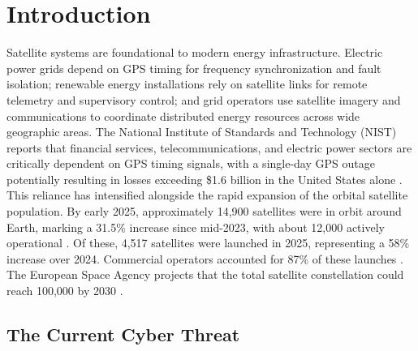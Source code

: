 \section{Introduction}

Satellite systems are foundational to modern energy infrastructure. Electric power grids depend on GPS timing for frequency synchronization and fault isolation; renewable energy installations rely on satellite links for remote telemetry and supervisory control; and grid operators use satellite imagery and communications to coordinate distributed energy resources across wide geographic areas. The National Institute of Standards and Technology (NIST) reports that financial services, telecommunications, and electric power sectors are critically dependent on GPS timing signals, with a single-day GPS outage potentially resulting in losses exceeding \$1.6 billion in the United States alone \cite{NIST2022gps, Brattle2024}. This reliance has intensified alongside the rapid expansion of the orbital satellite population. By early 2025, approximately 14,900 satellites were in orbit around Earth, marking a 31.5\% increase since mid-2023, with about 12,000 actively operational \cite{Pixalytics2025, NanoAvionics2025}. Of these, 4,517 satellites were launched in 2025, representing a 58\% increase over 2024. Commercial operators accounted for 87\% of these launches \cite{PayloadSpace2025}. The European Space Agency projects that the total satellite constellation could reach 100,000 by 2030 \cite{ESA2025}.

\subsection{The Current Cyber Threat}

